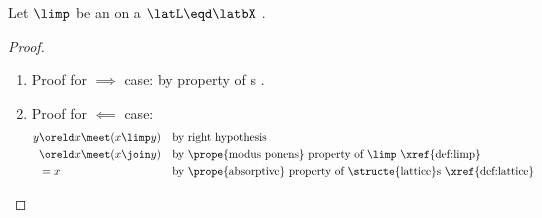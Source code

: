 \begin{proposition}
\label{prop:limp_iff}
Let $\limp$ be an   on a  $\latL\eqd\latbX$ .
\end{proposition}
\begin{proof}
\begin{enumerate}
  \item Proof for $\implies$ case: by  property of s .
  \item Proof for $\impliedby$ case: 
    \begin{align*}
      y
        &\oreld x\meet(x\limp y)
        && \text{by right hypothesis}
      \\&\oreld x\meet(x\join y)
        && \text{by \prope{modus ponens} property of $\limp$ \xref{def:limp}}
      \\&= x
        && \text{by \prope{absorptive} property of \structe{lattice}s \xref{def:lattice}}
    \end{align*}
\end{enumerate}
\end{proof}


